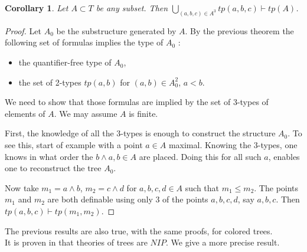 \documentclass[english]{article}
\newtheorem{cor}[thm]{Corollary}
\theoremstyle{definition}
\theoremstyle{mystyle}
\theoremstyle{remark}
\begin{document}
\begin{cor}\label{3types}
Let $A \subset T$ be any subset. Then $\bigcup_{(a,b,c) \in A^3} tp(a,b,c) \vdash tp(A)$.
\end{cor}
\begin{proof}
Let $A_0$ be the substructure generated by $A$. By the previous theorem the following set of formulas implies the type of $A_0$ :
\begin{itemize}
\item the quantifier-free type of $A_0$,
\item the set of 2-types $tp(a,b)$ for $(a,b) \in A_0^2$, $a < b$.
\end{itemize}
We need to show that those formulas are implied by the set of 3-types of elements of $A$. We may assume $A$ is finite.

First, the knowledge of all the 3-types is enough to construct the structure $A_0$. To see this, start of example with a point $a \in A$ maximal. Knowing the 3-types, one knows in what order the $b \wedge a, b\in A$ are placed. Doing this for all such $a$, enables one to reconstruct the tree $A_0$.

Now take $m_1 = a\wedge b$, $m_2=c \wedge d$ for $a,b,c,d \in A$ such that $m_1 \leq m_2$. The points $m_1$ and $m_2$ are both definable using only 3 of the points $a,b,c,d$, say $a,b,c$. Then $tp(a,b,c) \vdash tp(m_1,m_2)$.
\end{proof}

The previous results are also true, with the same proofs, for colored trees.
\\

It is proven in \cite{Par} that theories of trees are $NIP$. We give a more precise result.
\end{document}
